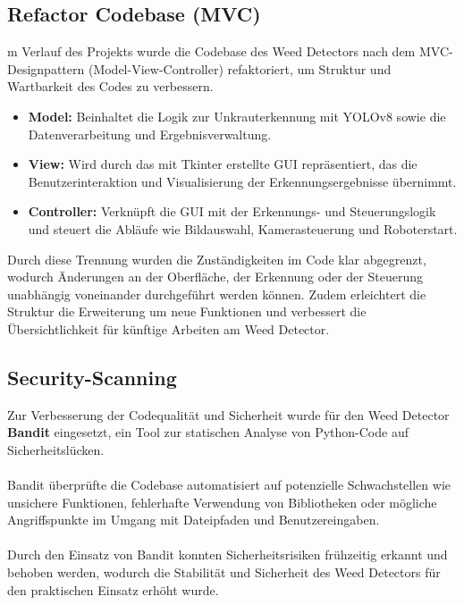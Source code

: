 \documentclass[12pt]{scrartcl}
\begin{document}
\subsection{Refactor Codebase (MVC)}
m Verlauf des Projekts wurde die Codebase des Weed Detectors nach dem MVC-Designpattern (Model-View-Controller) refaktoriert, um Struktur und Wartbarkeit des Codes zu verbessern.
\begin{itemize}
    \item \textbf{Model:} Beinhaltet die Logik zur Unkrauterkennung mit YOLOv8 sowie die Datenverarbeitung und Ergebnisverwaltung.
    \item \textbf{View:} Wird durch das mit Tkinter erstellte GUI repräsentiert, das die Benutzerinteraktion und Visualisierung der Erkennungsergebnisse übernimmt.
    \item \textbf{Controller:} Verknüpft die GUI mit der Erkennungs- und Steuerungslogik und steuert die Abläufe wie Bildauswahl, Kamerasteuerung und Roboterstart.
\end{itemize}
Durch diese Trennung wurden die Zuständigkeiten im Code klar abgegrenzt, wodurch Änderungen an der Oberfläche, der Erkennung oder der Steuerung unabhängig voneinander durchgeführt werden können. Zudem erleichtert die Struktur die Erweiterung um neue Funktionen und verbessert die Übersichtlichkeit für künftige Arbeiten am Weed Detector.

\subsection{Security-Scanning}
Zur Verbesserung der Codequalität und Sicherheit wurde für den Weed Detector \textbf{Bandit} eingesetzt, ein Tool zur statischen Analyse von Python-Code auf Sicherheitslücken.\\
\\
Bandit überprüfte die Codebase automatisiert auf potenzielle Schwachstellen wie unsichere Funktionen, fehlerhafte Verwendung von Bibliotheken oder mögliche Angriffspunkte im Umgang mit Dateipfaden und Benutzereingaben.\\
\\
Durch den Einsatz von Bandit konnten Sicherheitsrisiken frühzeitig erkannt und behoben werden, wodurch die Stabilität und Sicherheit des Weed Detectors für den praktischen Einsatz erhöht wurde.
\end{document}
